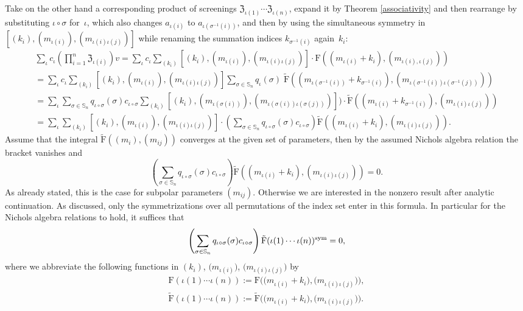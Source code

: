 \documentclass[pdftex]{sigma}%
\numberwithin{equation}{section}
\renewcommand{\S}{\mathbb{S}}
\newcommand{\zem}{\mathfrak{Z}}
\newcommand{\Fp}{\mathrm{F}}
\newcommand{\rFp}{\tilde{\mathrm{F}}}
\begin{document}
Take on the other hand a corresponding product of screenings $\zem_{\iota(1)}\cdots \zem_{\iota(n)}$, expand it by Theorem \ref{associativity} and then rearrange by substituting $\iota\circ\sigma$ for~$\iota$, which also changes $a_{\iota(i)}$ to $a_{\iota(\sigma^{-1}(i))}$, and then by using the simultaneous symmetry in $[(k_i),(m_{\iota(i)}),(m_{\iota(i)\iota(j)})]$ while renaming the summation indices $k_{\sigma^{-1}(i)}$ again~$k_i$:
 \begin{gather*}
\sum_{\iota} c_{\iota}\left(\prod_{i=1}^n \zem_{\iota(i)}\right)  v
=\sum_\iota c_\iota \sum_{(k_{i})} [(k_i),(m_{\iota(i)}),(m_{\iota(i)\iota(j)})]\cdot \Fp((m_{\iota(i)}+k_i),(m_{\iota(i),\iota(j)})) \\
=\sum_\iota c_\iota \sum_{(k_{i})} [(k_i),(m_{\iota(i)}),(m_{\iota(i)\iota(j)})]
\sum_{\sigma\in \S_n} q_{\iota}(\sigma)\;\rFp((m_{\iota(\sigma^{-1}(i))}+k_{\sigma^{-1}(i)}),(m_{\iota(\sigma^{-1}(i))\iota(\sigma^{-1}(j))}))\\
=\sum_\iota\sum_{\sigma\in \S_n} q_{\iota\circ\sigma}(\sigma) c_{\iota\circ\sigma} \sum_{(k_{i})} [(k_i),(m_{\iota(\sigma(i))}),(m_{\iota(\sigma(i))\iota(\sigma(j))})]
)\cdot\rFp((m_{\iota(i)}+k_{\sigma^{-1}(i)}),(m_{\iota(i)\iota(j)}))\\
=\sum_\iota\sum_{(k_{i})} [(k_{i}),(m_{\iota(i)}),(m_{\iota(i)\iota(j)})]
\cdot\left(\sum_{\sigma\in \S_n} q_{\iota\circ\sigma}(\sigma) c_{\iota\circ\sigma} \right)\rFp((m_{\iota(i)}+k_{i}),(m_{\iota(i)\iota(j)})).
\end{gather*}
Assume that the integral $\rFp((m_i),(m_{ij}))$ converges at the given set of parameters, then by the assumed Nichols algebra relation the bracket vanishes and
\[\left(\sum_{\sigma\in \S_n} q_{\iota\circ\sigma}(\sigma) c_{\iota\circ\sigma} \right)\rFp((m_{\iota(i)}+k_{i}),(m_{\iota(i)\iota(j)}))=0.\]
As already stated, this is the case for subpolar parameters $(m_{ij})$. Otherwise we are interested in the nonzero result after analytic continuation. As discussed, only the symmetrizations over all permutations of the index set enter in this formula. In particular for the Nichols algebra relations to hold, it suffices that
\[\left(\sum_{\sigma\in \S_n} q_{\iota\circ\sigma}(\sigma) c_{\iota\circ\sigma} \right)\rFp(\iota(1)\cdots\iota(n))^{{\rm sym}}=0,\]
where we abbreviate the following functions in $(k_i)$, $\big(m_{\iota(i)}\big)$, $\big(m_{\iota(i)\iota(j)}\big)$ by
\begin{gather*}
\Fp(\iota(1)\cdots\iota(n)):=\Fp\big(\big(m_{\iota(i)}+k_{i}\big),\big(m_{\iota(i)\iota(j)}\big)\big),\\
\rFp(\iota(1)\cdots\iota(n)):=\rFp\big(\big(m_{\iota(i)}+k_{i}\big),\big(m_{\iota(i)\iota(j)}\big)\big).
\end{gather*}
\end{document}

